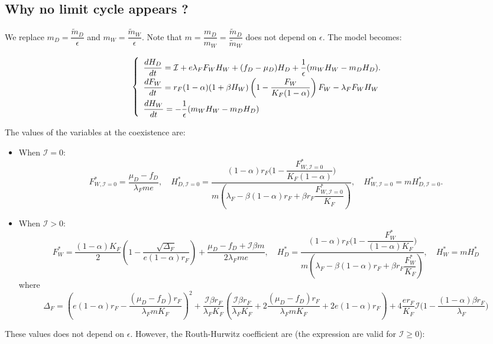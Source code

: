 \documentclass{article}
\newcommand{\lfw}{\lambda_{F}}
\newcommand{\lfw}{\lambda_{F}}
\newcommand{\cI}{\mathcal{I}}
\begin{document}
\subsection{Why no limit cycle appears ?}
We replace $m_D = \dfrac{\tilde m_D}{\epsilon}$ and $m_W = \dfrac{\tilde m _W}{\epsilon}$. Note that $m = \dfrac{m_D}{m_W} = \dfrac{\tilde m_D}{\tilde m_ W}$ does not depend on $\epsilon$. The model becomes:

\begin{equation}
\def\arraystretch{2}
\left\{ 
\begin{array}{l}
\dfrac{dH_D}{dt}= \cI + e \lfw F_W H_W + (f_D - \mu_D) H_D + \dfrac{1}{\epsilon}(m_W H_W - m_D H_D). \\
\dfrac{dF_W}{dt} = r_F(1- \alpha) (1+ \beta H_W) \left(1 - \dfrac{F_W}{K_F(1-\alpha)} \right) F_W - \lfw F_W H_W \\
\dfrac{dH_W}{dt}= - \dfrac{1}{\epsilon}(m_W H_W - m_D H_D)
\end{array} \right.
\label{equationsHDFWHW, fast}
\end{equation}

The values of the variables at the coexistence are:

\begin{itemize}
\item When $\cI = 0$:
$$F^*_{W, \cI = 0} = \dfrac{\mu_D - f_D}{\lfw m e},
\quad 
H^*_{D, \cI = 0} = \dfrac{(1-\alpha)r_F\Big(1 - \dfrac{F^*_{W, \cI = 0}}{K_F(1-\alpha)} \Big)}{m\left(\lfw - \beta (1-\alpha) r_F + \beta r_F  \dfrac{F^*_{W, \cI = 0}}{K_F}\right)} ,
\quad 
H^*_{W, \cI = 0} = m H^*_{D, \cI = 0}.$$
\item When $\cI > 0$:
$$F^*_{W} = \dfrac{(1-\alpha)K_F}{2}\left(1 - \dfrac{\sqrt{\Delta_F}}{e(1-\alpha)r_F}\right) + \dfrac{\mu_D - f_D + \cI \beta m}{2\lfw m e},\quad
H^*_{D} = \dfrac{(1-\alpha)r_F\Big(1 - \dfrac{F^*_{W}}{(1-\alpha)K_F} \Big)}{m\left(\lfw - \beta (1-\alpha) r_F + \beta r_F  \dfrac{F^*_{W}}{K_F}\right)},
\quad 
H^*_{W} = m H^*_{D}$$
where
$$
\Delta_F = \left(e(1-\alpha)r_F - \dfrac{(\mu_D - f_D) r_F}{\lfw m K_F}\right)^2 + \dfrac{\cI \beta r_F}{\lfw K_F} \left(\dfrac{\cI \beta r_F}{\lfw K_F} + 2\dfrac{(\mu_D - f_D) r_F}{\lfw m K_F} + 2e(1-\alpha)r_F \right) + 4\dfrac{er_F}{K_F}  \cI\Big(1 - \dfrac{(1-\alpha)\beta r_F}{\lfw} \Big)
$$
\end{itemize}

These values does not depend on $\epsilon$. However, the Routh-Hurwitz coefficient are (the expression are valid for $\cI \geq 0$):
\end{document}
